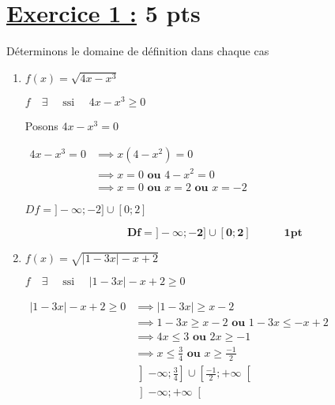 \documentclass[12pt,a4paper]{article}
\begin{document}
\section*{\underline{Exercice 1 :} 5 pts }
Déterminons le domaine de définition dans chaque cas
\begin{enumerate}
    \item $f(x) = \sqrt{4x - x^3}$

\( f\quad \exists\quad  \text{ ssi } \quad 4x - x^3 \geq 0 \)

Posons \( 4x - x^3 = 0 \)

\(
\begin{aligned}
4x - x^3 = 0 &\implies x(4 - x^2) = 0\\
						 &\implies x = 0 \textbf{ ou } 4 - x^2 = 0\\
 						 &\implies	x = 0 \textbf{ ou } x = 2 \textbf{ ou } x = -2
\end{aligned}
\)  

\begin{center}
\end{center}    

\begin{center}
\( Df = ]-\infty;-2] \cup [0 ; 2 ] \) 
\end{center}   

          \begin{resultbox}
            \[
                \mathbf{Df = ]-\infty;-2] \cup [0 ; 2 ]\quad\quad\quad \textbf{1pt}}
            \]
        \end{resultbox}     
    
    \item $f(x) = \sqrt{|1 - 3x| - x + 2}$
    
    \( f\quad \exists\quad  \text{ ssi } \quad |1 - 3x| - x + 2 \geq 0 \)

\(
\begin{aligned}
|1 - 3x| - x + 2 \geq 0 &\implies |1 - 3x| \geq  x - 2\\
						 &\implies 1 - 3x \geq  x - 2 \textbf{ ou } 1 - 3x \leq  -x + 2\\
 						 &\implies	4x \leq 3 \textbf{ ou }  2x \geq  -1\\
 						 &\implies	x \leq \frac{3}{4} \textbf{ ou }  x \geq \frac{-1}{2}\\
 						 &\left]-\infty;\frac{3}{4}\right] \cup \left[\frac{-1}{2} ; +\infty\right[\\
 						 &\left]-\infty ; +\infty\right[
\end{aligned}
\)  
   

\end{enumerate}
\end{document}
